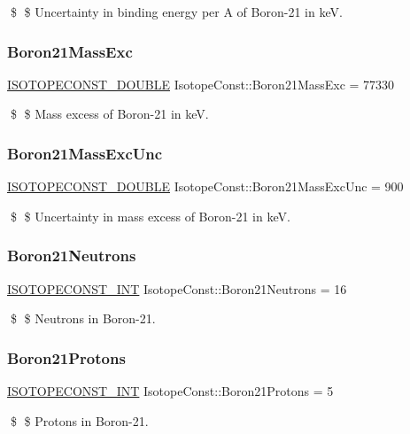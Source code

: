 \$ \$ Uncertainty in binding energy per A of Boron-\/21 in keV. \mbox{\label{group___isotope_const-_boron-_b21_ga6c5540d651c7ddf5c3b5e242d726952e}} 
\subsubsection{\texorpdfstring{Boron21\+Mass\+Exc}{Boron21MassExc}}
{\footnotesize\ttfamily \mbox{\hyperlink{group___isotope_const-_macros_ga8f45a7272ce02c0b4c65c44636ed719a}{I\+S\+O\+T\+O\+P\+E\+C\+O\+N\+S\+T\+\_\+\+D\+O\+U\+B\+LE}} Isotope\+Const\+::\+Boron21\+Mass\+Exc = 77330}

\$ \$ Mass excess of Boron-\/21 in keV. \mbox{\label{group___isotope_const-_boron-_b21_ga816a3a8029612214b812e026641a2326}} 
\subsubsection{\texorpdfstring{Boron21\+Mass\+Exc\+Unc}{Boron21MassExcUnc}}
{\footnotesize\ttfamily \mbox{\hyperlink{group___isotope_const-_macros_ga8f45a7272ce02c0b4c65c44636ed719a}{I\+S\+O\+T\+O\+P\+E\+C\+O\+N\+S\+T\+\_\+\+D\+O\+U\+B\+LE}} Isotope\+Const\+::\+Boron21\+Mass\+Exc\+Unc = 900}

\$ \$ Uncertainty in mass excess of Boron-\/21 in keV. \mbox{\label{group___isotope_const-_boron-_b21_ga89abaca7d1f4e01a6f3b89b03b1a0e23}} 
\subsubsection{\texorpdfstring{Boron21\+Neutrons}{Boron21Neutrons}}
{\footnotesize\ttfamily \mbox{\hyperlink{group___isotope_const-_macros_ga5f18360b3e99483a35c32d789e62621c}{I\+S\+O\+T\+O\+P\+E\+C\+O\+N\+S\+T\+\_\+\+I\+NT}} Isotope\+Const\+::\+Boron21\+Neutrons = 16}

\$ \$ Neutrons in Boron-\/21. \mbox{\label{group___isotope_const-_boron-_b21_ga9bd29c1d85290dbe055561a6a8a50c17}} 
\subsubsection{\texorpdfstring{Boron21\+Protons}{Boron21Protons}}
{\footnotesize\ttfamily \mbox{\hyperlink{group___isotope_const-_macros_ga5f18360b3e99483a35c32d789e62621c}{I\+S\+O\+T\+O\+P\+E\+C\+O\+N\+S\+T\+\_\+\+I\+NT}} Isotope\+Const\+::\+Boron21\+Protons = 5}

\$ \$ Protons in Boron-\/21. 